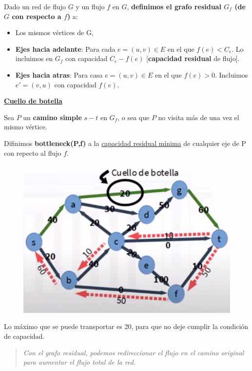 \documentclass{article}
\begin{document}
Dado un red de flujo \(G\) y un flujo \(f\) en \(G\), 
\textbf{definimos el grafo residual \(G_f\) (de \(G\) con respecto a \(f\))} a:

\begin{itemize}
    \item Los mismos vértices de G,
    \item \textbf{Ejes hacia adelante}: Para cada \(e=(u,v) \in E\) en el que \(f(e) < C_e\). 
    Lo incluimos en \(G_f\) con capacidad \(C_e-f(e)\) [\textbf{capacidad residual} de flujo].
    \item \textbf{Ejes hacia atras}: Para casa \(e=(u,v) \in E\) en el que \(f(e) > 0\). 
    Incluimos \(e'=(v,u)\) con capacidad \(f(e)\).
\end{itemize}

\noindent
\underline{\textbf{Cuello de botella}}

Sea \(P\) un \textbf{camino simple} \(s-t\) en \(G_f\), o sea que \(P\) no visita más de una vez el mismo vértice.

Difinimos \textbf{bottleneck(P,f)} a la \underline{capacidad residual mínima} de cualquier eje de P con repecto al flujo \(f\).

\begin{figure}[h!]
    \includegraphics[width=\linewidth]{imagenes/cuello-de-botella.png}
\end{figure}

Lo máximo que se puede transportar es 20, para que no deje cumplir la condición de capacidad.

\begin{quote}
    \textit{Con el grafo residual, podemos redireccionar el flujo en el camino original para aumentar el flujo total de la red.}
\end{quote}
\end{document}
